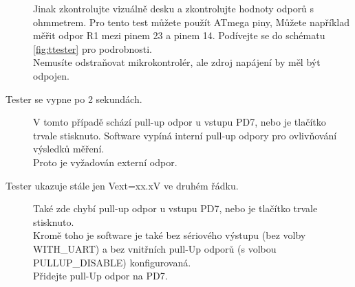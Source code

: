 \begin{description}
Jinak zkontrolujte vizuálně desku a zkontrolujte hodnoty odporů s ohmmetrem.
Pro tento test můžete použít ATmega piny,
Můžete například měřit odpor R1 mezi pinem 23 a pinem 14.
Podívejte se do schématu \ref{fig:ttester} pro podrobnosti.\\
Nemusíte odstraňovat mikrokontrolér, ale zdroj napájení by měl být odpojen.
\vspace{-0,3 cm}
\item[Tester se vypne po 2 sekundách.]  
V tomto případě schází pull-up odpor u vstupu PD7, nebo je tlačítko trvale stisknuto.
Software vypíná interní pull-up odpory pro ovlivňování výsledků měření.\\ Proto je vyžadován externí odpor.
\vspace{-0,3 cm}
\item[Tester ukazuje stále jen Vext=xx.xV ve druhém řádku.]
Také zde chybí pull-up odpor u vstupu PD7, nebo je tlačítko trvale stisknuto.\\
Kromě toho je software je také bez sériového výstupu (bez volby WITH\_UART) a bez vnitřních
pull-Up odporů (s volbou PULLUP\_DISABLE) konfigurovaná.\\
Přidejte pull-Up odpor na PD7.

\end{description}
